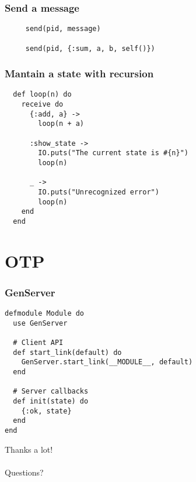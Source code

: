 \documentclass{beamer}
\begin{document}
\begin{frame}[fragile]
  \frametitle{Send a message}
  \begin{verbatim}
     send(pid, message)

     send(pid, {:sum, a, b, self()})
  \end{verbatim}
\end{frame}

\begin{frame}[fragile]
  \frametitle{Mantain a state with recursion}
  \begin{verbatim}
  def loop(n) do
    receive do
      {:add, a} ->
        loop(n + a)

      :show_state ->
        IO.puts("The current state is #{n}")
        loop(n)

      _ ->
        IO.puts("Unrecognized error")
        loop(n)
    end
  end
  \end{verbatim}
\end{frame}

\section{OTP}
 \begin{frame}[fragile]
  \frametitle{GenServer}
  \begin{verbatim}
defmodule Module do
  use GenServer

  # Client API
  def start_link(default) do
    GenServer.start_link(__MODULE__, default)
  end

  # Server callbacks
  def init(state) do
    {:ok, state}
  end
end
  \end{verbatim}
\end{frame}

\begin{frame}
  \centering
  \Large{Thanks a lot!}\\
  \hspace{0pt} \\
  \Large{Questions?}
\end{frame}
\end{document}
